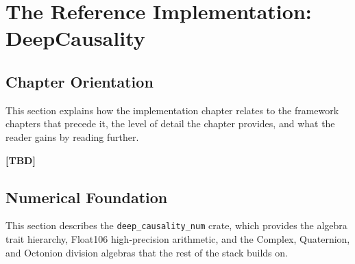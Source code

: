 
\section{The Reference Implementation: DeepCausality}
\label{sec:implementation}



%
%
%
 
 
\subsection{Chapter Orientation}
\label{sec:implementation_orientation}
 
This section explains how the implementation chapter relates to the framework chapters that precede it, the level of detail the chapter provides, and what the reader gains by reading further.
 
\textbf{[TBD]}
 
 
\subsection{Numerical Foundation}
\label{sec:implementation_num}
 
This section describes the \texttt{deep\_causality\_num} crate, which provides the algebra trait hierarchy, Float106 high-precision arithmetic, and the Complex, Quaternion, and Octonion division algebras that the rest of the stack builds on.
 
